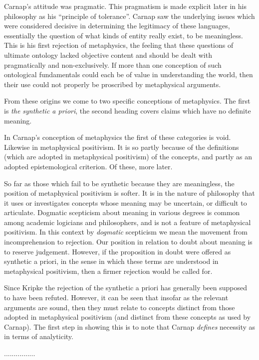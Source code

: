 Carnap's attitude was pragmatic.
This pragmatism is made explicit later in his philosophy as his
``principle of tolerance''.
Carnap saw the underlying issues which were considered decisive in
determining the legitimacy of these languages, essentially the
question of what kinds of entity really exist, to be meaningless.
This is his first rejection of metaphysics, the feeling that these
questions of ultimate ontology lacked objective content and should be dealt
with pragmatically and non-exclusively.
If more than one conception of such ontological fundamentals could
each be of value in understanding the world, then their use could not
properly be proscribed by metaphysical arguments.

From these origins we come to two specific conceptions of metaphysics.
The first is \emph{the synthetic a priori}, the second heading covers
claims which have no definite meaning.

In Carnap's conception of metaphysics the first of these categories is
void.
Likewise in metaphysical positivism.
It is so partly because of the definitions (which are adopted in
metaphysical positivism) of the concepts, and partly as an adopted
epistemological criterion.
Of these, more later.

So far as those which fail to be synthetic because they are
meaningless, the position of metaphysical positivism is softer.
It is in the nature of philosophy that it uses or investigates
concepts whose meaning may be uncertain, or difficult to articulate.
Dogmatic scepticism about meaning in various degrees is common among
academic logicians and philosophers, and is not a feature of
metaphysical positivism.
In this context by \emph{dogmatic} scepticism we mean the movement
from incomprehension to rejection.
Our position in relation to doubt about meaning is to reserve
judgement.
However, if the proposition in doubt were offered as synthetic a
  priori, in the sense in which these terms are understood in
  metaphysical positivism, then a firmer rejection would be called for. 

Since Kripke the rejection of the synthetic a priori has generally
been supposed to have been refuted.
However, it can be seen that insofar as the relevant arguments are
sound, then they must relate to concepts distinct from those adopted
in metaphysical positivism (and distinct from these concepts as used
by Carnap).
The first step in showing this is to note that Carnap \emph{defines}
necessity as in terms of analyticity.

................


